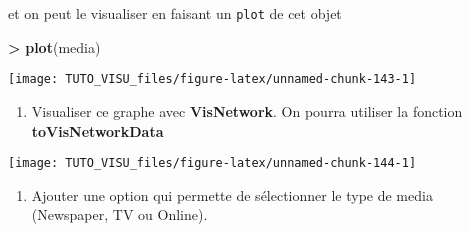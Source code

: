 \documentclass[]{article}
\newenvironment{Shaded}{\begin{snugshade}}{\end{snugshade}}
\newcommand{\DataTypeTok}[1]{\textcolor[rgb]{0.13,0.29,0.53}{#1}}
\newcommand{\KeywordTok}[1]{\textcolor[rgb]{0.13,0.29,0.53}{\textbf{#1}}}
\newcommand{\NormalTok}[1]{#1}
\newcommand{\OperatorTok}[1]{\textcolor[rgb]{0.81,0.36,0.00}{\textbf{#1}}}
\newcommand{\StringTok}[1]{\textcolor[rgb]{0.31,0.60,0.02}{#1}}
\providecommand{\tightlist}{%
  \setlength{\itemsep}{0pt}\setlength{\parskip}{0pt}}
\theoremstyle{definition}
\theoremstyle{definition}
\theoremstyle{definition}
\theoremstyle{remark}
\begin{document}
et on peut le visualiser en faisant un \texttt{plot} de cet objet

\begin{Shaded}
\begin{Highlighting}[]
\OperatorTok{>}\StringTok{ }\KeywordTok{plot}\NormalTok{(media)}
\end{Highlighting}
\end{Shaded}

\begin{center}\texttt{[image: TUTO\_VISU\_files/figure-latex/unnamed-chunk-143-1]} \end{center}

\begin{enumerate}
\def\labelenumi{\arabic{enumi}.}
\tightlist
\item
  Visualiser ce graphe avec \textbf{VisNetwork}. On pourra utiliser la fonction \textbf{toVisNetworkData}
\end{enumerate}

\begin{Shaded}
\end{Shaded}

\begin{center}\texttt{[image: TUTO\_VISU\_files/figure-latex/unnamed-chunk-144-1]} \end{center}

\begin{enumerate}
\def\labelenumi{\arabic{enumi}.}
\setcounter{enumi}{1}
\tightlist
\item
  Ajouter une option qui permette de sélectionner le type de media (Newspaper, TV ou Online).
\end{enumerate}

\begin{Shaded}
\end{Shaded}
\end{document}
